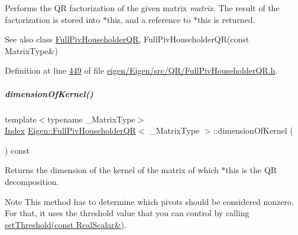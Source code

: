 Performs the QR factorization of the given matrix {\itshape matrix}. The result of the factorization is stored into {\ttfamily $\ast$this}, and a reference to {\ttfamily $\ast$this} is returned.

\begin{DoxySeeAlso}{See also}
class \hyperlink{group___q_r___module_class_eigen_1_1_full_piv_householder_q_r}{Full\+Piv\+Householder\+QR}, Full\+Piv\+Householder\+Q\+R(const Matrix\+Type\&) 
\end{DoxySeeAlso}


Definition at line \hyperlink{eigen_2_eigen_2src_2_q_r_2_full_piv_householder_q_r_8h_source_l00449}{449} of file \hyperlink{eigen_2_eigen_2src_2_q_r_2_full_piv_householder_q_r_8h_source}{eigen/\+Eigen/src/\+Q\+R/\+Full\+Piv\+Householder\+Q\+R.\+h}.

\mbox{\label{group___q_r___module_a3b5fe5edc66acc01c45b16e728470aa0}} 
\subparagraph{\texorpdfstring{dimension\+Of\+Kernel()}{dimensionOfKernel()}\hspace{0.1cm}{\footnotesize\ttfamily [1/2]}}
{\footnotesize\ttfamily template$<$typename \+\_\+\+Matrix\+Type$>$ \\
\hyperlink{namespace_eigen_a62e77e0933482dafde8fe197d9a2cfde}{Index} \hyperlink{group___q_r___module_class_eigen_1_1_full_piv_householder_q_r}{Eigen\+::\+Full\+Piv\+Householder\+QR}$<$ \+\_\+\+Matrix\+Type $>$\+::dimension\+Of\+Kernel (\begin{DoxyParamCaption}{ }\end{DoxyParamCaption}) const\hspace{0.3cm}{\ttfamily [inline]}}

\begin{DoxyReturn}{Returns}
the dimension of the kernel of the matrix of which $\ast$this is the QR decomposition.
\end{DoxyReturn}
\begin{DoxyNote}{Note}
This method has to determine which pivots should be considered nonzero. For that, it uses the threshold value that you can control by calling \hyperlink{group___q_r___module_a92277e572bf98245891015d12dd2b602}{set\+Threshold(const Real\+Scalar\&)}. 
\end{DoxyNote}


